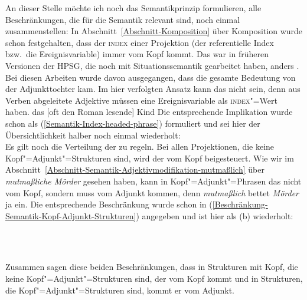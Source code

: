 An dieser Stelle möchte ich noch das Semantikprinzip formulieren, \dash alle Beschränkungen, die für
die Semantik relevant sind, noch einmal zusammenstellen: In Abschnitt~\ref{Abschnitt-Komposition} über Komposition wurde schon
festgehalten, dass der \textsc{index} einer Projektion (der referentielle Index bzw.\ die
Ereignisvariable) immer vom Kopf kommt. Das war in früheren Versionen der HPSG, die noch mit
Situationssemantik gearbeitet haben, anders \citep{ps2}. Bei diesen Arbeiten wurde davon
ausgegangen, dass die gesamte Bedeutung von der Adjunkttochter kam. Im hier verfolgten Ansatz kann
das nicht sein, denn aus Verben abgeleitete Adjektive müssen eine Ereignisvariable als
\textsc{index}"=Wert haben.
\ea
das [oft den Roman lesende] Kind
\z
Die entsprechende Implikation wurde schon als (\ref{Semantik-Index-headed-phrase}) formuliert und
sei hier der Übersichtlichkeit halber noch einmal wiederholt:
\ea
\label{Semantik-Index-headed-phrase2}\label{Semantikprinzip-IND}
 \impl\\
\z
Es gilt noch die Verteilung der \ltopwe zu regeln. Bei allen Projektionen, die keine
Kopf"=Adjunkt"=Strukturen sind, wird der \ltopw vom Kopf beigesteuert. Wie wir im Abschnitt~\ref{Abschnitt-Semantik-Adjektivmodifikation-mutmaßlich}
über \emph{mutmaßliche Mörder} gesehen haben, kann in Kopf"=Adjunkt"=Phrasen das \ltop nicht vom
Kopf, sondern muss vom Adjunkt kommen, denn \emph{mutmaßlich} bettet \emph{Mörder} ja ein. Die
entsprechende Beschränkung wurde schon in (\ref{Beschränkung-Semantik-Kopf-Adjunkt-Strukturen})
angegeben und ist hier als (b) wiederholt:

\eal
\label{Semantikprinzip-LTOP}
\ex {} \impl\\
\ex
\label{Beschränkung-Semantik-Kopf-Adjunkt-Strukturen2} 
 \impl\\

\zl 
Zusammen sagen diese beiden Beschränkungen, dass in Strukturen mit Kopf, die keine
Kopf"=Adjunkt"=Strukturen sind, der \ltopw vom Kopf kommt und in Strukturen, die
Kopf"=Adjunkt"=Strukturen sind, kommt er vom Adjunkt.

